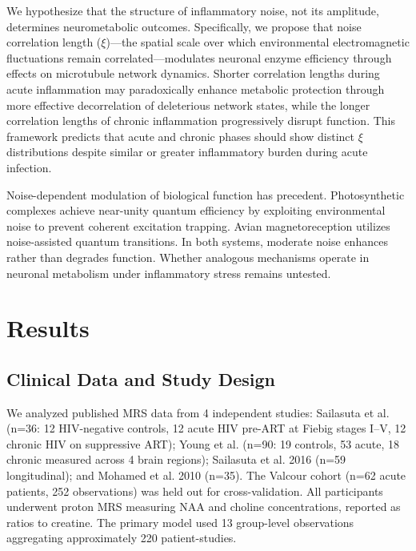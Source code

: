 \documentclass[10pt,a4paper]{article}
\begin{document}
We hypothesize that the structure of inflammatory noise, not its amplitude, determines neurometabolic outcomes. Specifically, we propose that noise correlation length ($\xi$)---the spatial scale over which environmental electromagnetic fluctuations remain correlated---modulates neuronal enzyme efficiency through effects on microtubule network dynamics\cite{craddock2017}. Shorter correlation lengths during acute inflammation may paradoxically enhance metabolic protection through more effective decorrelation of deleterious network states, while the longer correlation lengths of chronic inflammation progressively disrupt function. This framework predicts that acute and chronic phases should show distinct $\xi$ distributions despite similar or greater inflammatory burden during acute infection.

Noise-dependent modulation of biological function has precedent. Photosynthetic complexes achieve near-unity quantum efficiency by exploiting environmental noise to prevent coherent excitation trapping\cite{engel2007}. Avian magnetoreception utilizes noise-assisted quantum transitions\cite{lambert2013}. In both systems, moderate noise enhances rather than degrades function\cite{huelga2013}. Whether analogous mechanisms operate in neuronal metabolism under inflammatory stress remains untested.

\section{Results}

\subsection{Clinical Data and Study Design}

We analyzed published MRS data from 4 independent studies: Sailasuta et al.\cite{sailasuta2012} (n=36: 12 HIV-negative controls, 12 acute HIV pre-ART at Fiebig stages I--V, 12 chronic HIV on suppressive ART); Young et al.\cite{young2014} (n=90: 19 controls, 53 acute, 18 chronic measured across 4 brain regions); Sailasuta et al. 2016\cite{sailasuta2016} (n=59 longitudinal); and Mohamed et al. 2010 (n=35). The Valcour cohort\cite{valcour2012,valcour2013} (n=62 acute patients, 252 observations) was held out for cross-validation. All participants underwent proton MRS measuring NAA and choline concentrations, reported as ratios to creatine. The primary model used 13 group-level observations aggregating approximately 220 patient-studies.
\end{document}

